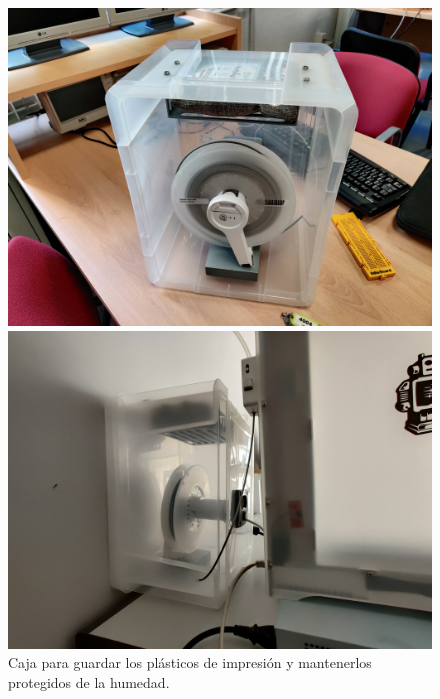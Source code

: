 \begin{figure}[H]
    \centering
    \begin{minipage}{.49\linewidth}
        \centering
        \includegraphics[width=\linewidth]{pictures/dry_box_1.jpg}
    \end{minipage}
    \hfill
    \begin{minipage}{.49\linewidth}
        \centering
        \includegraphics[width=\linewidth]{pictures/dry_box_2.jpg}
    \end{minipage}
    \caption{Caja para guardar los plásticos de impresión y mantenerlos protegidos de la humedad.}
    \label{fig:dry_box}
\end{figure}

